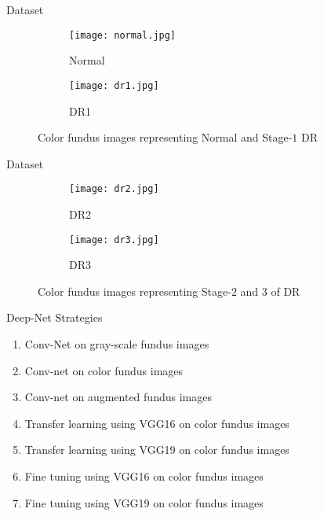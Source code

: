 \documentclass{beamer}
\begin{document}
\begin{frame}{Dataset}
\begin{figure}
\centering
\begin{subfigure}{0.45\linewidth} \vspace{15pt}
\texttt{[image: normal.jpg]}
\caption{Normal}
\label{fig:a}
\end{subfigure}
\quad
\begin{subfigure}{0.45\linewidth}
\texttt{[image: dr1.jpg]}
\caption{DR1}
\label{fig:b}
\end{subfigure}
\caption{Color fundus images representing Normal and Stage-$1$ DR}
\label{fig: Image1}
\end{figure}

\end{frame}
\begin{frame}{Dataset}
\begin{figure}
\centering
\begin{subfigure}{0.45\linewidth}
\texttt{[image: dr2.jpg]}
\caption{DR2}
\label{fig:a}
\end{subfigure}
\quad
\begin{subfigure}{0.45\linewidth} \vspace{15pt}
\texttt{[image: dr3.jpg]}
\caption{DR3}
\label{fig:b}
\end{subfigure}
\caption{Color fundus images representing Stage-$2$ and $3$ of DR}
\label{fig: Image2}
\end{figure}
\end{frame}

\begin{frame}{Deep-Net Strategies}

\begin{enumerate}
\item Conv-Net on gray-scale fundus images
\item Conv-net on color fundus images
\item Conv-net on augmented fundus images
\item Transfer learning using VGG16 on color fundus images
\item Transfer learning using VGG19 on color fundus images
\item Fine tuning using VGG16 on color fundus images
\item Fine tuning using VGG19 on color fundus images
\end{enumerate}
\end{frame}
\end{document}
